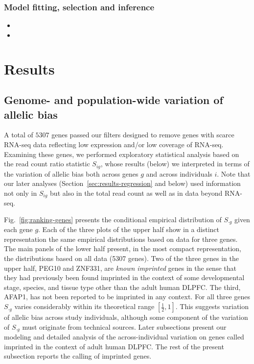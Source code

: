 \documentclass[12pt,letterpaper]{article}
\begin{document}
\subsubsection{Model fitting, selection and inference}

\begin{itemize}
\item {}
\item {}
\end{itemize}

\section{Results}

\subsection{Genome- and population-wide variation of allelic bias}

A total of \(5307\) genes passed our filters designed to remove genes with
scarce RNA-seq data reflecting low expression and/or low coverage of RNA-seq.
Examining these genes, we performed exploratory statistical analysis based on
the read count ratio statistic \(S_{ig}\), whose results (below) we
interpreted in terms of the variation of allelic bias both across genes \(g\)
and across individuals \(i\).  Note that our later analyses
(Section~\ref{sec:results-regression} and below) used
information not only in \(S_{ig}\) but also in the total read count as well as
in data beyond RNA-seq.

Fig.~\ref{fig:ranking-genes} presents the conditional empirical distribution
of \(S_{\cdot g}\) given each gene \(g\).  Each of the three plots of the
upper half show in a distinct representation the same empirical distributions
based on data for three genes.  The main panels of the lower half present, in
the most compact representation, the distributions based on all data (5307
genes).  Two of the three genes in the upper half, PEG10 and ZNF331, are
\emph{known imprinted} genes in the sense that they had previously been found
imprinted in the context of some developmental stage, species, and tissue type
other than the adult human DLPFC.  The third, AFAP1, has not been reported to be imprinted
in any context.  For all three genes \(S_{\cdot g}\) varies considerably
within its theoretical range \([\frac{1}{2}, 1]\).  This suggests variation of
allelic bias across study individuals, although some component of the
variation of \(S_{\cdot g}\) must originate from technical sources.  Later
subsections present our modeling and detailed analysis of the
across-individual variation on genes called imprinted in the context of adult
human DLPFC.  The rest of the present subsection reports the calling of
imprinted genes.
\end{document}
